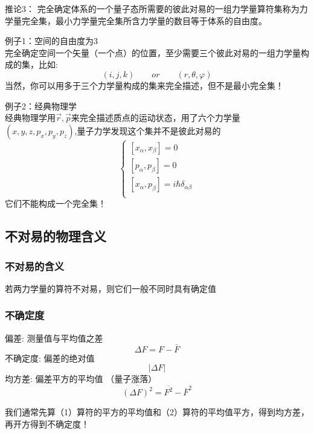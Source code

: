 \begin{frame} [allowframebreaks=]
    \begin{tcolorbox1}{推论3：}
        完全确定体系的一个量子态所需要的彼此对易的一组力学量算符集称为力学量完全集，最小力学量完全集所含力学量的数目等于体系的自由度。
    \end{tcolorbox1}
    \alert{例子1：空间的自由度为3} \\
    完全确定空间一个矢量（一个点）的位置，至少需要三个彼此对易的一组力学量构成的集，比如: $$(i,j,k) \qquad or \qquad (r,\theta,\varphi) $$
    当然，你可以用多于三个力学量构成的集来完全描述，但不是最小完全集！\\
\end{frame} 

\begin{frame}
    \alert{例子2：经典物理学} \\
    经典物理学用$\vec{r}, \vec{p}$来完全描述质点的运动状态，用了六个力学量$(x,y,z, p_x, p_y, p_z)$,量子力学发现这个集并不是彼此对易的
    $$\begin{cases}
        [x_\alpha,x_\beta]= 0  \\ 
        [p_\alpha,p_\beta]= 0  \\ 
        [x_\alpha,p_\beta]= i\hbar \delta_{\alpha\beta}  \\ 
    \end{cases}$$
    它们不能构成一个完全集！
\end{frame} 

\subsection{不对易的物理含义}

\begin{frame} 
    \frametitle{不对易的含义}
    \begin{tcolorbox4}[不确定性原理:]
        若两力学量的算符不对易，则它们一般不同时具有确定值    
    \end{tcolorbox4}
\end{frame} 

\begin{frame} 
    \frametitle{不确定度}
    \begin{itemize}
        \Item 偏差: 测量值与平均值之差
        $$ \Delta F=F-\bar{F} $$
        \Item 不确定度: 偏差的绝对值
         $$ \left | \Delta F  \right | $$
        \Item 均方差: 偏差平方的平均值 （量子涨落）
        $$ \overline{(\Delta F)^2} = \overline{F^2} - \overline{F}^2$$
    \end{itemize}   
    我们通常先算（1）算符的平方的平均值和（2）算符的平均值平方，得到均方差，再开方得到不确定度！
\end{frame} 


